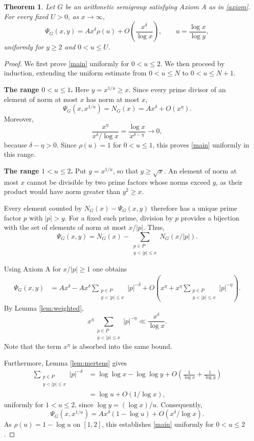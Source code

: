 \documentclass[10pt,a4paper]{amsart}
\newtheorem{theorem}{Theorem}[section]
\begin{document}
\begin{theorem}\label{thm:main}
Let $G$ be an arithmetic semigroup satisfying Axiom A
as in \eqref{axiom}. For every fixed $U>0$, as $x\to\infty$,
\begin{equation}\label{main}
\Psi_G(x,y)
=
Ax^\delta\rho(u)
+O\!\left(\frac{x^\delta}{\log x}\right),
\qquad
u=\frac{\log x}{\log y},
\end{equation}
uniformly for $y\ge2$ and $0<u\le U$.
\end{theorem}

\begin{proof}
We first prove \eqref{main} uniformly for $0<u\le2$.
We then proceed by induction, extending the uniform
estimate from $0<u\le N$ to $0<u\le N+1$.

\smallskip
\noindent\textbf{The range $0<u\le1$.}
Here $y=x^{1/u}\ge x$. Since every prime divisor of an
element of norm at most $x$ has norm at most $x$,
\[
\Psi_G(x,x^{1/u})=N_G(x)=Ax^\delta+O(x^\eta).
\]
Moreover,
\[
\frac{x^\eta}{x^\delta/\log x}
=
\frac{\log x}{x^{\delta-\eta}}
\longrightarrow0,
\]
because $\delta-\eta>0$. Since $\rho(u)=1$ for
$0<u\le1$, this proves \eqref{main} uniformly in this range.

\smallskip
\noindent\textbf{The range $1<u\le2$.}
Put $y=x^{1/u}$, so that $y\ge\sqrt{x}$.
An element of norm at most $x$ cannot be divisible by two prime
factors whose norms exceed $y$, as
their product would have norm greater than $y^2\ge x$.

Every element counted by $N_G(x)-\Psi_G(x,y)$ therefore
has a unique prime factor $p$ with $|p|>y$.
For a fixed such prime, division by $p$ provides a
bijection with the set of elements of norm at most $x/|p|$. Thus,
\[
\Psi_G(x,y)
=
N_G(x)
-\sum_{\substack{p\in P\\y<|p|\le x}}N_G(x/|p|).
\]

Using Axiom A for $x/|p|\ge1$ one obtains
\begin{align*}
\Psi_G(x,y)
&=
Ax^\delta
-Ax^\delta
\sum_{\substack{p\in P\\y<|p|\le x}}|p|^{-\delta}+
O\!\left(
x^\eta+
x^\eta
\sum_{\substack{p\in P\\y<|p|\le x}}|p|^{-\eta}
\right).
\end{align*}
By Lemma \ref{lem:weighted},
\[
x^\eta
\sum_{\substack{p\in P\\y<|p|\le x}}|p|^{-\eta}
\ll\frac{x^\delta}{\log x}.
\]
Note that the term $x^\eta$ is absorbed into the same bound.

Furthermore, Lemma \ref{lem:mertens} gives
\begin{align*}
\sum_{\substack{p\in P\\y<|p|\le x}}|p|^{-\delta}
&=
\log\log x-\log\log y
+O\!\left(\frac1{\log x}+\frac1{\log y}\right)\\
&=
\log u+O(1/\log x),
\end{align*}
uniformly for $1<u\le2$, since $\log y=(\log x)/u$.
Consequently,
\[
\Psi_G(x,x^{1/u})
=
Ax^\delta(1-\log u)
+O(x^\delta/\log x).
\]
As $\rho(u)=1-\log u$ on $[1,2]$, this establishes
\eqref{main} uniformly for $0<u\le2$.


\end{proof}
\end{document}
